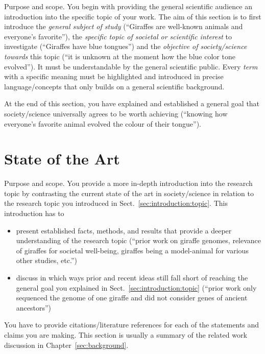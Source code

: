 \documentclass[12pt,a4paper,footinclude=true,twoside,headinclude=true]{report}
\begin{document}
\textsf{Purpose and scope}. You begin with providing the general scientific audience an introduction into the specific topic of your work. The aim of this section is to first introduce the \emph{general subject of study} (``Giraffes are well-known animals and everyone's favorite''), the \emph{specific topic of societal or scientific interest} to investigate (``Giraffes have blue tongues'') and the \emph{objective of society/science towards} this topic (``it is unknown at the moment how the blue color tone evolved''). 
It must be understandable by the general scientific public. Every \emph{term} with a specific meaning must be highlighted and introduced in precise language/concepts that only builds on a general scientific background. 

At the end of this section, you have explained and established a general goal that society/science universally agrees to be worth achieving (``knowing how everyone's favorite animal evolved the colour of their tongue'').

\section{State of the Art}\label{sec:introduction:state-of-art}

\textsf{Purpose and scope}. You provide a more in-depth introduction into the research topic by contrasting the current state of the art in society/science in relation to the research topic you introduced in Sect.~\ref{sec:introduction:topic}. This introduction has to 

\begin{itemize}
    \item present established facts, methods, and results that provide a deeper  understanding of the research topic (``prior work on giraffe genomes, relevance of giraffes for societal well-being, giraffes being a model-animal for various other studies, etc.'')
    \item discuss in which ways prior and recent ideas still fall short of reaching the general goal you explained in Sect.~\ref{sec:introduction:topic} (``prior work only sequenced the genome of one giraffe and did not consider genes of ancient ancestors'')
\end{itemize}

You have to provide citations/literature references for each of the statements and claims you are making. This section is usually a summary of the related work discussion in Chapter~\ref{sec:background}.
\end{document}
